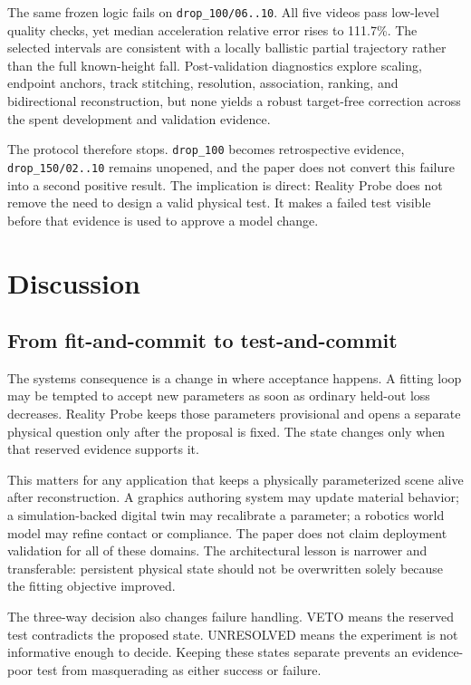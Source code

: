 \documentclass[acmtog]{acmart}
\begin{document}
The same frozen logic fails on \texttt{drop\_100/06..10}. All five videos pass low-level quality checks, yet median acceleration relative error rises to 111.7\%. The selected intervals are consistent with a locally ballistic partial trajectory rather than the full known-height fall. Post-validation diagnostics explore scaling, endpoint anchors, track stitching, resolution, association, ranking, and bidirectional reconstruction, but none yields a robust target-free correction across the spent development and validation evidence.

The protocol therefore stops. \texttt{drop\_100} becomes retrospective evidence, \texttt{drop\_150/02..10} remains unopened, and the paper does not convert this failure into a second positive result. The implication is direct: Reality Probe does not remove the need to design a valid physical test. It makes a failed test visible before that evidence is used to approve a model change.

\section{Discussion}\label{discussion}

\subsection{From fit-and-commit to test-and-commit}\label{why-the-channels-behave-differently}

The systems consequence is a change in where acceptance happens. A fitting loop may be tempted to accept new parameters as soon as ordinary held-out loss decreases. Reality Probe keeps those parameters provisional and opens a separate physical question only after the proposal is fixed. The state changes only when that reserved evidence supports it.

This matters for any application that keeps a physically parameterized scene alive after reconstruction. A graphics authoring system may update material behavior; a simulation-backed digital twin may recalibrate a parameter; a robotics world model may refine contact or compliance. The paper does not claim deployment validation for all of these domains. The architectural lesson is narrower and transferable: persistent physical state should not be overwritten solely because the fitting objective improved.

The three-way decision also changes failure handling. VETO means the reserved test contradicts the proposed state. UNRESOLVED means the experiment is not informative enough to decide. Keeping these states separate prevents an evidence-poor test from masquerading as either success or failure.
\end{document}
